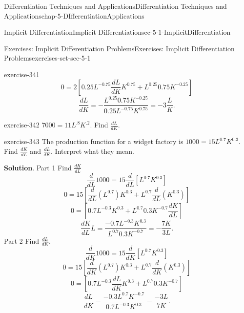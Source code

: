 \documentclass[oneside,10pt,]{book}
\numberwithin{equation}{section}
\begin{document}
\begin{chapterptx}{Differentiation Techniques and Applications}{}{Differentiation Techniques and Applications}{}{}{chap-5-DIfferentiationApplications}
\begin{sectionptx}{Implicit Differentiation}{}{Implicit Differentiation}{}{}{sec-5-1-ImplicitDifferentiation}
\begin{exercises-subsection-numberless}{Exercises: Implicit Differentiation Problems}{}{Exercises: Implicit Differentiation Problems}{}{}{exercises-set-sec-5-1}
\begin{divisionexercise}{11}{}{}{exercise-341}
\begin{equation*}
\end{equation*}
%
\begin{equation*}
0=2[0.25L^{-0.75}\frac{dL}{dK} K^{0.75}+L^{0.25} 0.75K^{-0.25} ]   
\end{equation*}
%
\begin{equation*}
\frac{dL}{dK}=-\frac{L^{0.25} 0.75K^{-0.25}}{0.25L^{-0.75} K^{0.75}}
=-3 \frac{L}{K}.
\end{equation*}
\end{divisionexercise}%
\begin{divisionexercise}{12}{}{}{exercise-342}%
\hypertarget{p-1922}{}%
7\(000=11L^.8 K^.2\).	Find \(\frac{dL}{dK}\).%
\end{divisionexercise}%
\begin{divisionexercise}{13}{}{}{exercise-343}%
\hypertarget{p-1923}{}%
The production function for a widget factory is \(1000=15L^{0.7} K^{0.3}\).  Find \(\frac{dK}{dL}\) and \(\frac{dL}{dK}\).  Interpret what they mean.%
\par\smallskip%
\noindent\textbf{Solution}.\hypertarget{solution-172}{}\quad%
\hypertarget{p-1924}{}%
Part 1 Find \(\frac{dK}{dL}\)%
%
\begin{equation*}
\frac{d}{dL} 1000=15\frac{d}{dL}[L^{0.7} K^{0.3}]
\end{equation*}
%
\begin{equation*}
0=15[\frac{d}{dL}  (L^{0.7} )K^{0.3}+L^{0.7}  \frac{d}{dL} (K^{0.3})]
\end{equation*}
%
\begin{equation*}
0=[0.7 L^{-0.3} K^{0.3}+L^{0.7} 0.3K^{-0.7}  \frac{dK}{dL}]
\end{equation*}
%
\begin{equation*}
\frac{dK}{dL}L=\frac{-0.7 L^{-0.3} K^{0.3}}{L^{0.7} 0.3K^{-0.7}} = -\frac{7K}{3L}.
\end{equation*}
\hypertarget{p-1925}{}%
Part 2 Find \(\frac{dL}{dK}\).%
%
\begin{equation*}
\frac{d}{dK} 1000=15\frac{d}{dK}[L^{0.7} K^{0.3}]
\end{equation*}
%
\begin{equation*}
0=15[\frac{d}{dK}  (L^{0.7}) K^{0.3}+L^{0.7} \frac{d}{dK} (K^{0.3})]
\end{equation*}
%
\begin{equation*}
0=[0.7 L^{-0.3}  \frac{dL}{dK} K^{0.3}+L^{0.7} 0.3K^{-0.7}]
\end{equation*}
%
\begin{equation*}
\frac{dL}{dK}=
\frac{- 0.3 L^{0.7} K^{-0.7}}{0.7  L^{-0.3} K^{0.3}} = \frac{-3L}{7K}.

\end{equation*}
\end{divisionexercise}
\end{exercises-subsection-numberless}
\end{sectionptx}
\end{chapterptx}
\end{document}
